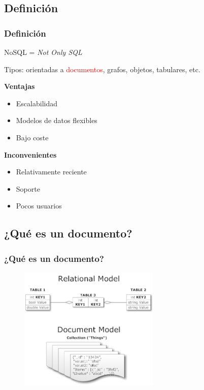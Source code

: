 \documentclass[serif,12pt]{beamer}
\begin{document}
\subsection{Definición}
\begin{frame}
\frametitle{Definición}

\begin{center}
NoSQL = \emph{Not Only SQL}
\end{center}

Tipos: orientadas a \textcolor{red}{documentos}, grafos, objetos, tabulares, etc.\newline


\begin{multicols}{2}

\textbf{Ventajas}
\begin{itemize}
\item Escalabilidad
\item Modelos de datos flexibles
\item Bajo coste
\end{itemize}

\textbf{Inconvenientes}
\begin{itemize}
\item Relativamente reciente
\item Soporte
\item Pocos usuarios
\end{itemize}

\end{multicols}

\end{frame}

\subsection{¿Qué es un documento?}
\begin{frame}
\frametitle{¿Qué es un documento?}

\begin{figure}
\centering
\includegraphics[width=0.6\textwidth, height=0.6\textheight]{images/document_vs_tables.png} 
\label{fig:document_vs_tables}
\end{figure}

\end{frame}
\end{document}

